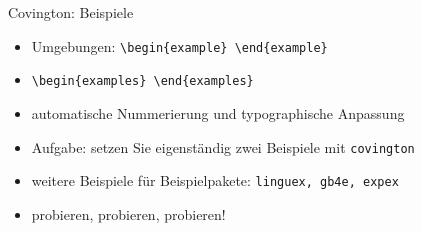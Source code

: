 \begin{frame}[fragile]{Covington: Beispiele}
    \begin{itemize}[<+->]
        \item Umgebungen: \lstinline|\begin{example} \end{example}|
        \item \lstinline|\begin{examples} \end{examples}|
        \item automatische Nummerierung und typographische Anpassung
        \item Aufgabe: setzen Sie eigenständig zwei Beispiele mit \texttt{covington}
        \item weitere Beispiele für Beispielpakete: \texttt{linguex, gb4e, expex}
        \item probieren, probieren, probieren!
    \end{itemize}
\end{frame}